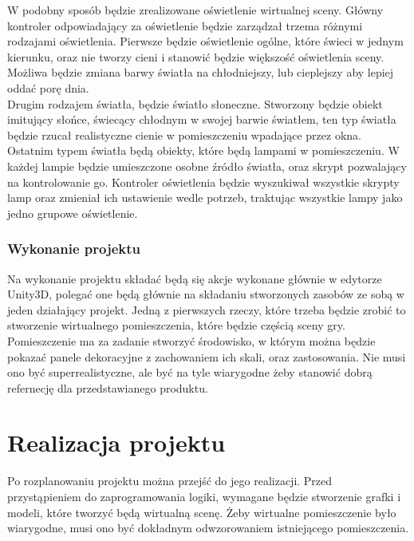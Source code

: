 \documentclass{article} %
\begin{document}
        W podobny sposób będzie zrealizowane oświetlenie wirtualnej sceny. Główny kontroler odpowiadający za oświetlenie będzie zarządzał trzema różnymi rodzajami oświetlenia. Pierwsze będzie oświetlenie ogólne, które świeci w jednym kierunku, oraz nie tworzy cieni i stanowić będzie większość oświetlenia sceny. Możliwa będzie zmiana barwy światła na chłodniejszy, lub cieplejszy aby lepiej oddać porę dnia. 
        \\
        
        Drugim rodzajem światła, będzie światło słoneczne. Stworzony będzie obiekt imitujący słońce, świecący chłodnym w swojej barwie światłem, ten typ światła będzie rzucał realistyczne cienie w pomieszczeniu wpadające przez okna. 
        \\
        
        Ostatnim typem światła będą obiekty, które będą lampami w pomieszczeniu. W każdej lampie będzie umieszczone osobne źródło światła, oraz skrypt pozwalający na kontrolowanie go. Kontroler oświetlenia będzie wyszukiwał wszystkie skrypty lamp oraz zmieniał ich ustawienie wedle potrzeb, traktując wszystkie lampy jako jedno grupowe oświetlenie.
        \\
        
        
        \subsubsection{Wykonanie projektu}
        Na wykonanie projektu składać będą się akcje wykonane głównie w edytorze Unity3D, polegać one będą głównie na składaniu stworzonych zasobów ze sobą w jeden działający projekt. Jedną z pierwszych rzeczy, które trzeba będzie zrobić to stworzenie wirtualnego pomieszczenia, które będzie częścią sceny gry.
        \\
        
        Pomieszczenie ma za zadanie stworzyć środowisko, w którym można będzie pokazać panele dekoracyjne z zachowaniem ich skali, oraz zastosowania. Nie musi ono być superrealistyczne, ale być na tyle wiarygodne żeby stanowić dobrą refernecję dla przedstawianego produktu.
        \\
        
        
        
\newpage
        
\section{Realizacja projektu}
    Po rozplanowaniu projektu można przejść do jego realizacji. Przed przystąpieniem do zaprogramowania logiki, wymagane będzie stworzenie grafki i modeli, które tworzyć będą wirtualną scenę. Żeby wirtualne pomieszczenie było wiarygodne, musi ono być dokładnym odwzorowaniem istniejącego pomieszczenia.
    \\
    
\end{document}
